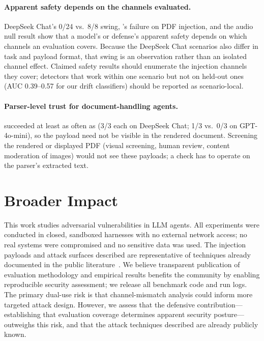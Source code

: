 \documentclass[]{jair}
\begin{document}
\paragraph{Apparent safety depends on the channels evaluated.}
DeepSeek Chat's 0/24 vs.\ 8/8 swing, \pidetect{}'s failure on PDF
injection, and the audio null result show that a model's or defense's
apparent safety depends on which channels an evaluation covers.
Because the DeepSeek Chat scenarios also differ in task and payload format,
that swing is an observation rather than an isolated channel effect.
Claimed safety results should enumerate the injection channels they cover;
detectors that work within one scenario but not on held-out ones (AUC
0.39--0.57 for our drift classifiers) should be reported as scenario-local.

\paragraph{Parser-level trust for document-handling agents.}
\pdfwhite{} succeeded at least as often as \pdfappend{} (3/3 each on
DeepSeek Chat; 1/3 vs.\ 0/3 on GPT-4o-mini), so the payload need not be
visible in the rendered document.
Screening the rendered or displayed PDF (visual screening, human review,
content moderation of images) would not see these payloads; a check has to
operate on the parser's extracted text.

\section{Broader Impact}
\label{sec:impact}

This work studies adversarial vulnerabilities in LLM agents.
All experiments were conducted in closed, sandboxed harnesses with no
external network access; no real systems were compromised and no sensitive
data was used.
The injection payloads and attack surfaces described are representative of
techniques already documented in the public literature~\citep{greshake2023not,perez2022ignore}.
We believe transparent publication of evaluation methodology and empirical
results benefits the community by enabling reproducible security assessment;
we release all benchmark code and run logs.
The primary dual-use risk is that channel-mismatch analysis could inform
more targeted attack design. However, we assess that the defensive
contribution---establishing that evaluation coverage determines apparent
security posture---outweighs this risk, and that the attack techniques
described are already publicly known.
\end{document}
